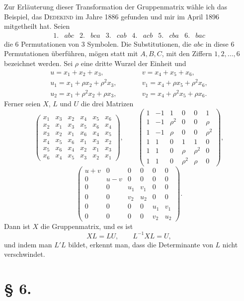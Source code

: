 \documentclass[11pt]{article}
\begin{document}
Zur Erläuterung dieser Transformation der Gruppenmatrix wähle ich das Beispiel, das \textsc{Dedekind} im Jahre 1886 gefunden und mir im April 1896 mitgetheilt hat. Seien
\[
\begin{array}{cccccccccccc}
1.&abc&2.&bca&3.&cab&4.&acb&5.&cba&6.&bac
\end{array}
\]
die 6 Permutationen von 3 Symbolen. Die Substitutionen, die $abc$ in diese 6 Permutationen überführen, mögen statt mit $A,B,C$, mit den Ziffern $1,2,\ldots,6$ bezeichnet werden. Sei $\rho$ eine dritte Wurzel der Einheit und
\[
\begin{array}{lll}
u=x_1+x_2+x_3, &\qquad& v=x_4+x_5+x_6,\\
u_1=x_1+\rho x_2+\rho^2x_3, && v_1=x_4+\rho x_5+\rho^2x_6,\\
u_2=x_1+\rho^2x_2+\rho x_3, && v_2=x_4+\rho^2x_5+\rho x_6.
\end{array}
\]
Ferner seien $X$, $L$ und $U$ die drei Matrizen
\[
\begin{pmatrix}
x_1&x_3&x_2&x_4&x_5&x_6\\
x_2&x_1&x_3&x_5&x_6&x_4\\
x_3&x_2&x_1&x_6&x_4&x_5\\
x_4&x_5&x_6&x_1&x_3&x_2\\
x_5&x_6&x_4&x_2&x_1&x_3\\
x_6&x_4&x_5&x_3&x_2&x_1
\end{pmatrix},
\qquad
\begin{pmatrix}
1&-1&1&0&0&1\\
1&-1&\rho^2&0&0&\rho\\
1&-1&\rho&0&0&\rho^2\\
1&1&0&1&1&0\\
1&1&0&\rho&\rho^2&0\\
1&1&0&\rho^2&\rho&0
\end{pmatrix},
\]
\[
\begin{pmatrix}
u+v&0&0&0&0&0\\
0&u-v&0&0&0&0\\
0&0&u_1&v_1&0&0\\
0&0&v_2&u_2&0&0\\
0&0&0&0&u_1&v_1\\
0&0&0&0&v_2&u_2
\end{pmatrix}.
\]
Dann ist $X$ die Gruppenmatrix, und es ist
\[
XL=LU,
\qquad
L^{-1}XL=U,
\]
und indem man $L'L$ bildet, erkennt man, dass die Determinante von $L$ nicht verschwindet.

\section*{§ 6.}
\end{document}
